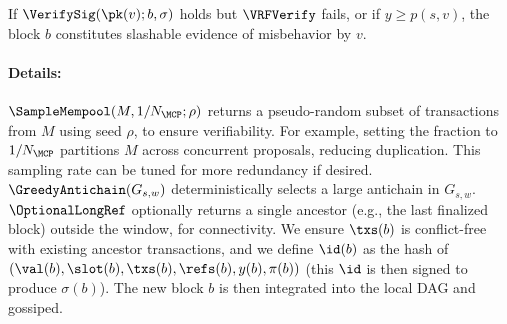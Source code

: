 \begin{remark}
If $\VerifySig(\pk(v); b, \sigma)$ holds but $\VRFVerify$ fails, or if $y \ge p(s,v)$, 
the block $b$ constitutes slashable evidence of misbehavior by $v$. 
\end{remark}


\paragraph{Details:} $\SampleMempool(M,1/N_{\MCP};\rho)$ returns a pseudo-random subset of transactions from $M$ using seed $\rho$, to ensure verifiability. For example, setting the fraction to $1/N_{\MCP}$ partitions $M$ across concurrent proposals, reducing duplication. This sampling rate can be tuned for more redundancy if desired. $\GreedyAntichain(G_{s,w})$ deterministically selects a large antichain in $G_{s,w}$. $\OptionalLongRef$ optionally returns a single ancestor (e.g., the last finalized block) outside the window, for connectivity. We ensure $\txs(b)$ is conflict-free with existing ancestor transactions, and we define $\id(b)$ as the hash of $(\val(b),\slot(b),\txs(b),\refs(b),y(b),\pi(b))$ (this $\id$ is then signed to produce $\sigma(b)$). The new block $b$ is then integrated into the local DAG and gossiped.

